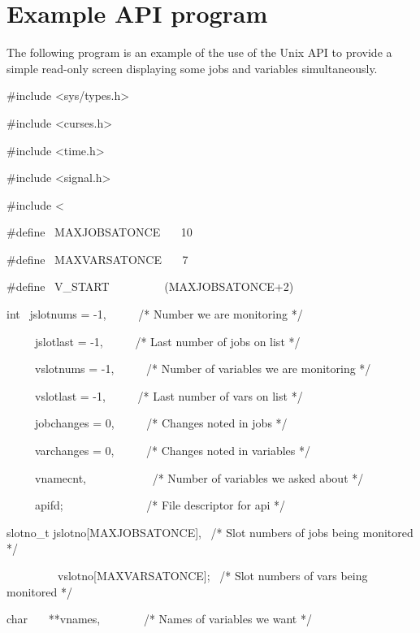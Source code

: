 \chapter{Example API program}
\label{chp:example-api-program}
The following program is an example of the use of the Unix API to
provide a simple read-only screen displaying some jobs and variables
simultaneously.

\begin{exparasmall}

\#include {\textless}sys/types.h{\textgreater}

\#include {\textless}curses.h{\textgreater}

\#include {\textless}time.h{\textgreater}

\#include {\textless}signal.h{\textgreater}

\#include {\textless}

\bigskip


\#define \ MAXJOBSATONCE \ \ \ 10

\#define \ MAXVARSATONCE \ \ \ 7

\#define \ V\_START \ \ \ \ \ \ \ \ \ (MAXJOBSATONCE+2)

\bigskip


int \ jslotnums = -1, \ \ \ \ \ /* Number we are monitoring */

\ \ \ \ \ jslotlast = -1, \ \ \ \ \ /* Last number of jobs on list */

\ \ \ \ \ vslotnums = -1, \ \ \ \ \ /* Number of variables we are
monitoring */

\ \ \ \ \ vslotlast = -1, \ \ \ \ \ /* Last number of vars on list */

\ \ \ \ \ jobchanges = 0, \ \ \ \ \ /* Changes noted in jobs */

\ \ \ \ \ varchanges = 0, \ \ \ \ \ /* Changes noted in variables */

\ \ \ \ \ vnamecnt, \ \ \ \ \ \ \ \ \ \ \ /* Number of variables we
asked about */

\ \ \ \ \ apifd; \ \ \ \ \ \ \ \ \ \ \ \ \ \ /* {\textquotedbl}File
descriptor{\textquotedbl} for api */

\bigskip


slotno\_t jslotno[MAXJOBSATONCE], \ /* Slot numbers of jobs being
monitored */

\ \ \ \ \ \ \ \ \ vslotno[MAXVARSATONCE]; \ /* Slot numbers of vars
being monitored */

\bigskip


char \ \ \ **vnames, \ \ \ \ \ \ \ /* Names of variables we want */


\end{exparasmall}

